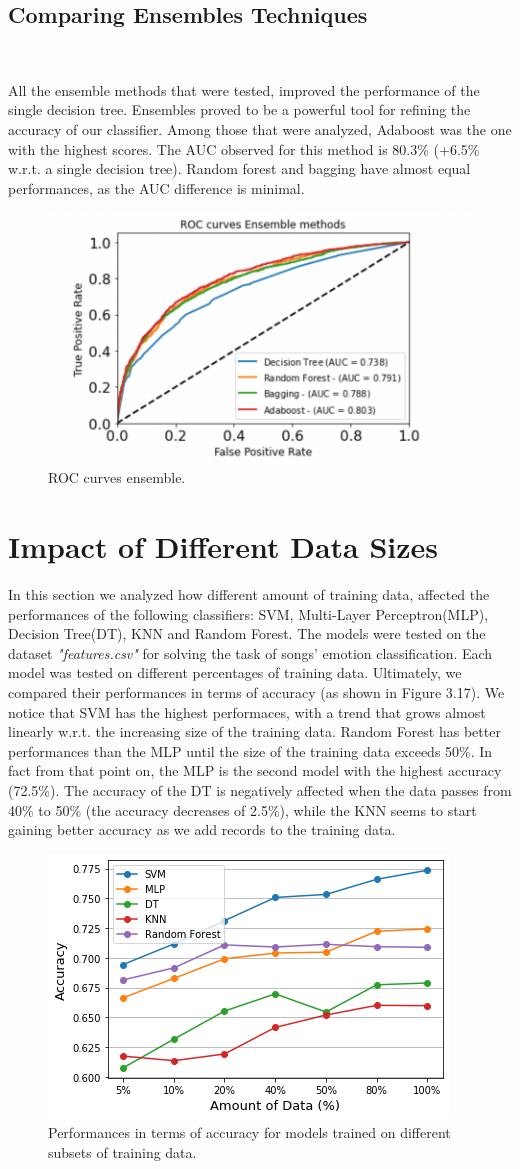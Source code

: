 \subsection{Comparing Ensembles Techniques}

\

All the ensemble methods that were tested, improved the performance of the single decision tree. Ensembles proved to be a powerful tool for refining the accuracy of our classifier. Among those that were analyzed, Adaboost was the one with the highest scores. The AUC observed for this method is 80.3\% (+6.5\% w.r.t. a single decision tree). Random forest and bagging have almost equal performances, as the AUC difference is minimal.   

\begin{figure}[htb!]
  \centering
  \includegraphics[width=0.5\linewidth]{images/ensemble-classifiers.png}
  \caption{ROC curves ensemble. }
\end{figure}
\section{Impact of Different Data Sizes}

In this section we analyzed how different amount of training data, affected the performances of the following classifiers: SVM, Multi-Layer Perceptron(MLP), Decision Tree(DT), KNN and Random Forest. The models were tested on the dataset \textit{"features.csv"} for solving the task of songs' emotion classification. Each model was tested on different percentages of training data. Ultimately, we compared their performances in terms of accuracy (as shown in Figure 3.17).
We notice that SVM has the highest performaces, with a trend that grows almost linearly w.r.t. the increasing size of the training data. Random Forest has better performances than the MLP until the size of the training data exceeds 50\%. In fact from that point on, the MLP is the second model with the highest accuracy (72.5\%). The accuracy of the DT is negatively affected when the data passes from 40\% to 50\% (the accuracy decreases of 2.5\%), while the KNN seems to start gaining better accuracy as we add records to the training data.

\begin{figure}[htb!]
  \centering
  \includegraphics[width=0.4\linewidth]{images/models-comparision-different-training-sizes.png}
  \caption{Performances in terms of accuracy for models trained on different subsets of training data.}
\end{figure}
